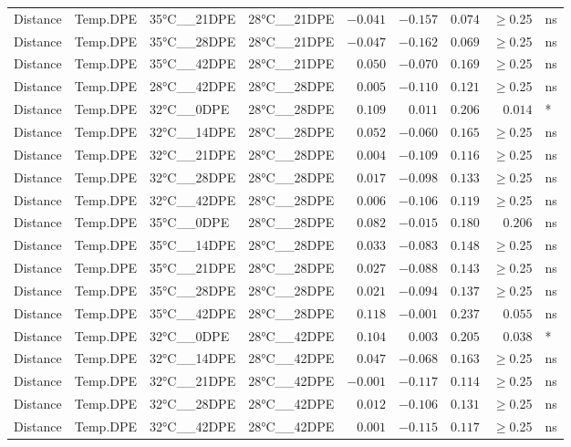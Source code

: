 \documentclass[
]{article}
\begin{document}
\begin{longtable}{llllrrrrl}
Distance & Temp.DPE & 35°C\_\_21DPE & 28°C\_\_21DPE & $-0.041$ & $-0.157$ & $0.074$ & $\geq$0.25 & ns \\ 
Distance & Temp.DPE & 35°C\_\_28DPE & 28°C\_\_21DPE & $-0.047$ & $-0.162$ & $0.069$ & $\geq$0.25 & ns \\ 
Distance & Temp.DPE & 35°C\_\_42DPE & 28°C\_\_21DPE & $0.050$ & $-0.070$ & $0.169$ & $\geq$0.25 & ns \\ 
Distance & Temp.DPE & 28°C\_\_42DPE & 28°C\_\_28DPE & $0.005$ & $-0.110$ & $0.121$ & $\geq$0.25 & ns \\ 
Distance & Temp.DPE & 32°C\_\_0DPE & 28°C\_\_28DPE & $0.109$ & $0.011$ & $0.206$ & $0.014$ & * \\ 
Distance & Temp.DPE & 32°C\_\_14DPE & 28°C\_\_28DPE & $0.052$ & $-0.060$ & $0.165$ & $\geq$0.25 & ns \\ 
Distance & Temp.DPE & 32°C\_\_21DPE & 28°C\_\_28DPE & $0.004$ & $-0.109$ & $0.116$ & $\geq$0.25 & ns \\ 
Distance & Temp.DPE & 32°C\_\_28DPE & 28°C\_\_28DPE & $0.017$ & $-0.098$ & $0.133$ & $\geq$0.25 & ns \\ 
Distance & Temp.DPE & 32°C\_\_42DPE & 28°C\_\_28DPE & $0.006$ & $-0.106$ & $0.119$ & $\geq$0.25 & ns \\ 
Distance & Temp.DPE & 35°C\_\_0DPE & 28°C\_\_28DPE & $0.082$ & $-0.015$ & $0.180$ & $0.206$ & ns \\ 
Distance & Temp.DPE & 35°C\_\_14DPE & 28°C\_\_28DPE & $0.033$ & $-0.083$ & $0.148$ & $\geq$0.25 & ns \\ 
Distance & Temp.DPE & 35°C\_\_21DPE & 28°C\_\_28DPE & $0.027$ & $-0.088$ & $0.143$ & $\geq$0.25 & ns \\ 
Distance & Temp.DPE & 35°C\_\_28DPE & 28°C\_\_28DPE & $0.021$ & $-0.094$ & $0.137$ & $\geq$0.25 & ns \\ 
Distance & Temp.DPE & 35°C\_\_42DPE & 28°C\_\_28DPE & $0.118$ & $-0.001$ & $0.237$ & $0.055$ & ns \\ 
Distance & Temp.DPE & 32°C\_\_0DPE & 28°C\_\_42DPE & $0.104$ & $0.003$ & $0.205$ & $0.038$ & * \\ 
Distance & Temp.DPE & 32°C\_\_14DPE & 28°C\_\_42DPE & $0.047$ & $-0.068$ & $0.163$ & $\geq$0.25 & ns \\ 
Distance & Temp.DPE & 32°C\_\_21DPE & 28°C\_\_42DPE & $-0.001$ & $-0.117$ & $0.114$ & $\geq$0.25 & ns \\ 
Distance & Temp.DPE & 32°C\_\_28DPE & 28°C\_\_42DPE & $0.012$ & $-0.106$ & $0.131$ & $\geq$0.25 & ns \\ 
Distance & Temp.DPE & 32°C\_\_42DPE & 28°C\_\_42DPE & $0.001$ & $-0.115$ & $0.117$ & $\geq$0.25 & ns \\ 

\end{longtable}
\end{document}
